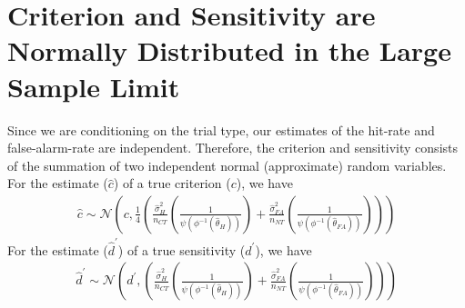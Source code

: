 \documentclass[12pt]{article}
\begin{document}
\section{Criterion and Sensitivity are Normally Distributed in the Large Sample Limit}
Since we are conditioning on the trial type, our estimates of the hit-rate and false-alarm-rate are independent. Therefore, the criterion and sensitivity consists of the summation of two independent normal (approximate) random variables. For the estimate ($\hat{c}$) of a true criterion ($c$), we have
\begin{align*}
    \hat{c} \sim \mathcal{N}\left( c,  \frac{1}{4}\left(\frac{\hat{\sigma}_{H}^2}{n_{CT}} \left(\frac{1}{\psi(\phi^{-1}(\hat{\theta}_{H}))}\right) + \frac{\hat{\sigma}_{FA}^2}{n_{NT}} \left(\frac{1}{\psi(\phi^{-1}(\hat{\theta}_{FA}))}\right)\right)\right)
\end{align*}
For the estimate ($\hat{d}^\prime$) of a true sensitivity ($d^\prime$), we have
\begin{align*}
    \hat{d}^\prime \sim \mathcal{N}\left( d^\prime,  \left(\frac{\hat{\sigma}_{H}^2}{n_{CT}} \left(\frac{1}{\psi(\phi^{-1}(\hat{\theta}_{H}))}\right) + \frac{\hat{\sigma}_{FA}^2}{n_{NT}}  \left(\frac{1}{\psi(\phi^{-1}(\hat{\theta}_{FA}))}\right)\right)\right)
\end{align*}
\end{document}
